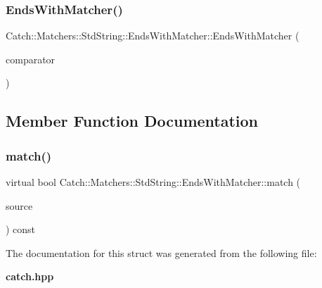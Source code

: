 \subsubsection{Ends\+With\+Matcher()}
{\footnotesize\ttfamily Catch\+::\+Matchers\+::\+Std\+String\+::\+Ends\+With\+Matcher\+::\+Ends\+With\+Matcher (\begin{DoxyParamCaption}\item[{\textbf{ Cased\+String} const \&}]{comparator }\end{DoxyParamCaption})}



\subsection{Member Function Documentation}
\mbox{\label{struct_catch_1_1_matchers_1_1_std_string_1_1_ends_with_matcher_a21c6dc68e30716d5c718f4f8c3186af1}} 
\subsubsection{match()}
{\footnotesize\ttfamily virtual bool Catch\+::\+Matchers\+::\+Std\+String\+::\+Ends\+With\+Matcher\+::match (\begin{DoxyParamCaption}\item[{std\+::string const \&}]{source }\end{DoxyParamCaption}) const\hspace{0.3cm}{\ttfamily [virtual]}}



The documentation for this struct was generated from the following file\+:\begin{DoxyCompactItemize}
\item 
\textbf{ catch.\+hpp}\end{DoxyCompactItemize}
